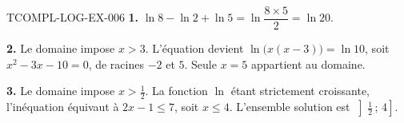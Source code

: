 \begin{corrige}{TCOMPL-LOG-EX-006}
\textbf{1.} $\ln8-\ln2+\ln5=\ln\dfrac{8\times5}{2}=\ln20$.

\textbf{2.} Le domaine impose $x>3$. L'équation devient
$\ln\big(x(x-3)\big)=\ln10$, soit $x^2-3x-10=0$, de racines $-2$ et $5$.
Seule $x=5$ appartient au domaine.

\textbf{3.} Le domaine impose $x>\tfrac12$. La fonction $\ln$ étant
strictement croissante, l'inéquation équivaut à $2x-1\leq7$, soit $x\leq4$.
L'ensemble solution est $\left]\tfrac12\,;\,4\right]$.
\end{corrige}
